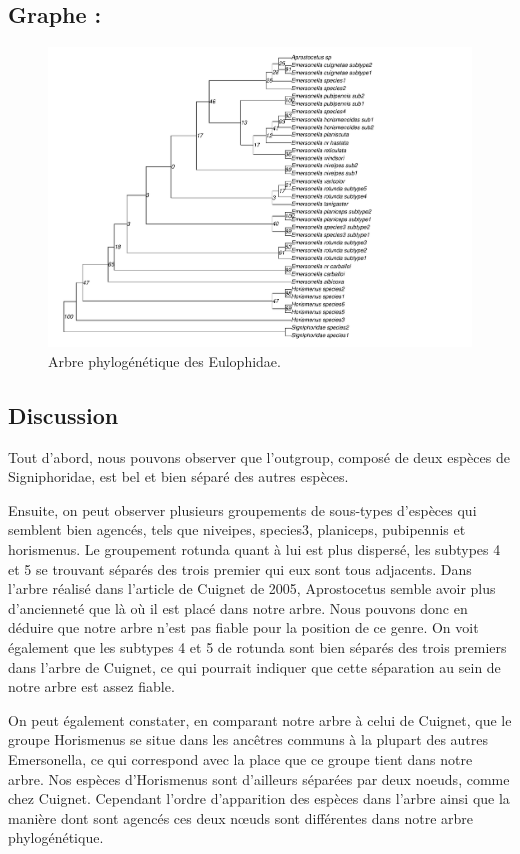 \documentclass[a4paper, 12pt]{article}
\begin{document}
\subsection{Graphe :}

\begin{figure}[H]
    \centering
    \includegraphics[width=1\textwidth]{plot_Eulo_Cyt_b_PhyML_GTR_modified.pdf}
    \caption{\small Arbre phylogénétique des Eulophidae.}
    \label{Eulo_tree}
\end{figure}

\subsection{Discussion}
Tout d’abord, nous pouvons observer que l’outgroup, composé de deux espèces de Signiphoridae, est bel et bien séparé des autres espèces.


Ensuite, on peut observer plusieurs groupements de sous-types d’espèces qui semblent bien agencés, tels que niveipes, species3, planiceps, pubipennis et horismenus. Le groupement rotunda quant à lui est plus dispersé, les subtypes 4 et 5 se trouvant séparés des trois premier qui eux sont tous adjacents. Dans l’arbre réalisé dans l’article de Cuignet de 2005, Aprostocetus semble avoir plus d’ancienneté que là où il est placé dans notre arbre. Nous pouvons donc en déduire que notre arbre n’est pas fiable pour la position de ce genre. On voit également que les subtypes 4 et 5 de rotunda sont bien séparés des trois premiers dans l’arbre de Cuignet, ce qui pourrait indiquer que cette séparation au sein de notre arbre est assez fiable. 


On peut également constater, en comparant notre arbre à celui de Cuignet, que le groupe Horismenus se situe dans les ancêtres communs à la plupart des autres Emersonella, ce qui correspond avec la place que ce groupe tient dans notre arbre. Nos espèces d’Horismenus sont d’ailleurs séparées par deux noeuds, comme chez Cuignet. Cependant l’ordre d’apparition des espèces dans l’arbre ainsi que la manière dont sont agencés ces deux nœuds sont différentes dans notre arbre phylogénétique.
\end{document}
